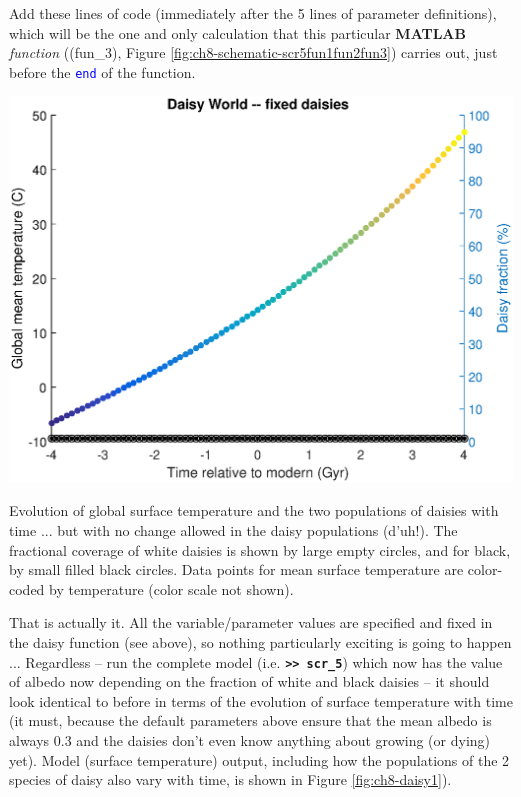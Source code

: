 \documentclass{tufte-book} %
\begin{document}
Add these lines of code (immediately after the 5 lines of parameter definitions), which will be the one and only calculation that this particular \textbf{MATLAB} \textit{function} ((\textsf{fun\_3}), Figure \ref{fig:ch8-schematic-scr5fun1fun2fun3}) carries out, just before the \texttt{\textcolor{blue}{end}} of the function.

\begin{marginfigure}[-0.0in]
\includegraphics[width=\linewidth]{ch8-daisy1.eps}
\caption{Evolution of global surface temperature and the two populations of daisies with time ... but with no change allowed in the daisy populations (d'uh!). The fractional coverage of white daisies is shown by large empty circles, and for black, by small filled black circles. Data points for mean surface temperature are color-coded by temperature (color scale not shown).}
\label{fig:ch8-daisy1}
\end{marginfigure}

That is actually it. All the variable/parameter values are specified and fixed in the daisy function (see above), so nothing particularly exciting is going to happen ... Regardless -- run the  complete model (i.e. \texttt{\textbf{\textgreater\textgreater\ scr\_5}}) which now has the value of albedo now depending on the fraction of white and black daisies  -- it should look identical to before in terms of the evolution of surface temperature with time (it must, because the default parameters above ensure that the mean albedo is always 0.3 and the daisies don't even know anything about growing (or dying) yet). Model (surface temperature) output, including how the populations of the 2 species of daisy also vary with time, is shown in Figure \ref{fig:ch8-daisy1}).  
\end{document}
